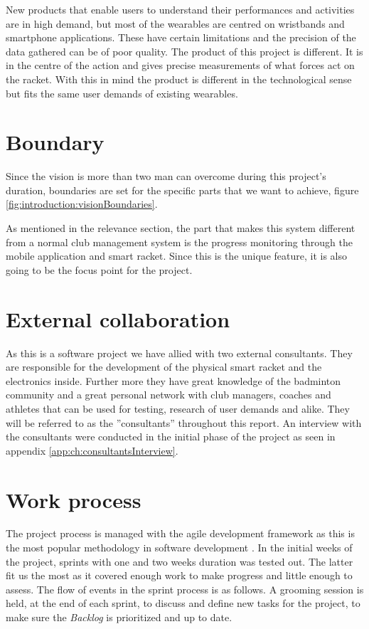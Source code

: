 New products that enable users to understand their performances and activities are in high demand, but most of the wearables are centred on wristbands and smartphone applications.
These have certain limitations and the precision of the data gathered can be of poor quality.
The product of this project is different.
It is in the centre of the action and gives precise measurements of what forces act on the racket.
With this in mind the product is different in the technological sense but fits the same user demands of existing wearables.

\section{Boundary}
Since the vision is more than two man can overcome during this project's duration, boundaries are set for the specific parts that we want to achieve, figure \ref{fig:introduction:visionBoundaries}.

As mentioned in the relevance section, the part that makes this system different from a normal club management system is the progress monitoring through the mobile application and smart racket.
Since this is the unique feature, it is also going to be the focus point for the project.


\section{External collaboration}
\label{sec:externalCollaboration}
As this is a software project we have allied with two external consultants.
They are responsible for the development of the physical smart racket and the electronics inside.
Further more they have great knowledge of the badminton community and a great personal network with club managers, coaches and athletes that can be used for testing, research of user demands and alike.
They will be referred to as the ''consultants'' throughout this report.
An interview with the consultants were conducted in the initial phase of the project as seen in appendix \ref{app:ch:consultantsInterview}.

\section{Work process}
The project process is managed with the agile  development framework as this is the most popular methodology in software development \citep{introduction:work:scrum}. 
In the initial weeks of the project, sprints with one and two weeks duration was tested out.
The latter fit us the most as it covered enough work to make progress and little enough to assess.
The flow of events in the sprint process is as follows.
A grooming session is held, at the end of each sprint, to discuss and define new tasks for the project, to make sure the \textit{Backlog} is prioritized and up to date.

